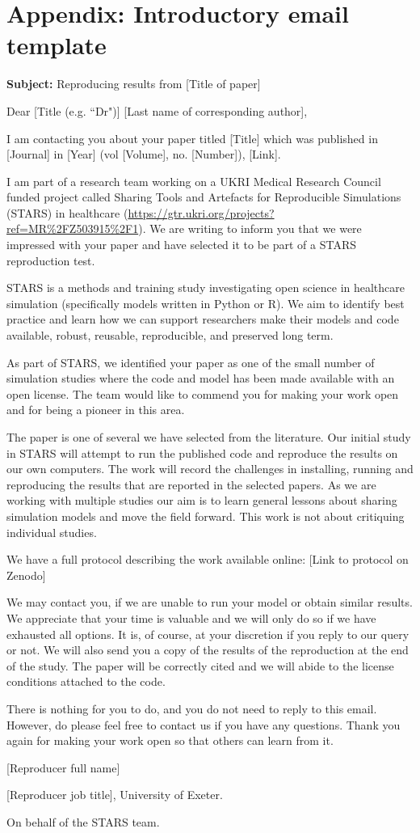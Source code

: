 \section{Appendix: Introductory email template} \label{appendix:email}

\textbf{Subject:} Reproducing results from [Title of paper]

Dear [Title (e.g. ``Dr")] [Last name of corresponding author],

I am contacting you about your paper titled [Title] which was published in [Journal] in [Year] (vol [Volume], no. [Number]), [Link].  

I am part of a research team working on a UKRI Medical Research Council funded project called Sharing Tools and Artefacts for Reproducible Simulations (STARS) in healthcare (\url{https://gtr.ukri.org/projects?ref=MR%2FZ503915%2F1}). We are writing to inform you that we were impressed with your paper and have selected it to be part of a STARS reproduction test.  

STARS is a methods and training study investigating open science in healthcare simulation (specifically models written in Python or R). We aim to identify best practice and learn how we can support researchers make their models and code available, robust, reusable, reproducible, and preserved long term.

As part of STARS, we identified your paper as one of the small number of simulation studies where the code and model has been made available with an open license.  The team would like to commend you for making your work open and for being a pioneer in this area.

The paper is one of several we have selected from the literature.  Our initial study in STARS will attempt to run the published code and reproduce the results on our own computers. The work will record the challenges in installing, running and reproducing the results that are reported in the selected papers.  As we are working with multiple studies our aim is to learn general lessons about sharing simulation models and move the field forward. This work is not about critiquing individual studies.  

We have a full protocol describing the work available online: [Link to protocol on Zenodo]

We may contact you, if we are unable to run your model or obtain similar results.  We appreciate that your time is valuable and we will only do so if we have exhausted all options.  It is, of course, at your discretion if you reply to our query or not.  We will also send you a copy of the results of the reproduction at the end of the study. The paper will be correctly cited and we will abide to the license conditions attached to the code.

There is nothing for you to do, and you do not need to reply to this email. However, do please feel free to contact us if you have any questions. Thank you again for making your work open so that others can learn from it.

[Reproducer full name]

[Reproducer job title], University of Exeter.

On behalf of the STARS team.